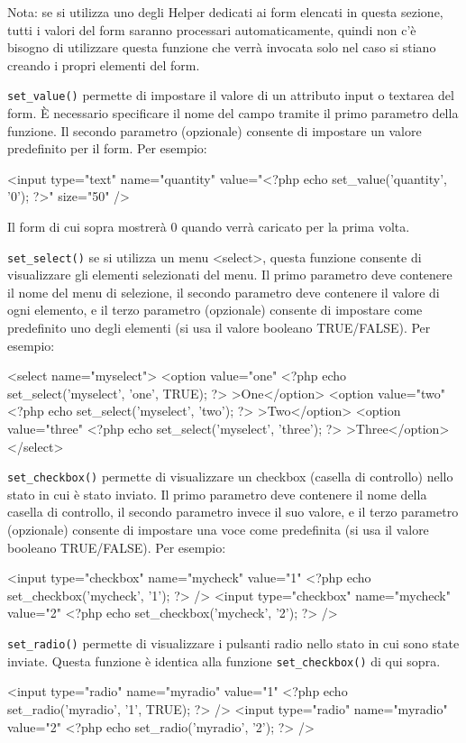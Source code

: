 Nota: se si utilizza uno degli Helper dedicati ai form elencati in questa sezione, tutti i valori del form saranno processari automaticamente, quindi non c'è bisogno di utilizzare questa funzione che verrà invocata solo nel caso si stiano creando i propri elementi del form.

\verb|set_value()| permette di impostare il valore di un attributo input o textarea del form. È necessario specificare il nome del campo tramite il primo parametro della funzione. Il secondo parametro (opzionale) consente di impostare un valore predefinito per il form. Per esempio:

\begin{code}
<input type="text" name="quantity" value="<?php echo set_value('quantity', '0'); ?>" size="50" />
\end{code}

Il form di cui sopra mostrerà 0 quando verrà caricato per la prima volta.

\verb|set_select()| se si utilizza un menu <select>, questa funzione consente di visualizzare gli elementi selezionati del menu. Il primo parametro deve contenere il nome del menu di selezione, il secondo parametro deve contenere il valore di ogni elemento, e il terzo parametro (opzionale) consente di impostare come predefinito uno degli elementi (si usa il valore booleano TRUE/FALSE). Per esempio:

\begin{code}
<select name="myselect">
<option value="one" <?php echo set_select('myselect', 'one', TRUE); ?> >One</option>
<option value="two" <?php echo set_select('myselect', 'two'); ?> >Two</option>
<option value="three" <?php echo set_select('myselect', 'three'); ?> >Three</option>
</select>
\end{code}

\verb|set_checkbox()| permette di visualizzare un checkbox (casella di controllo) nello stato in cui è stato inviato. Il primo parametro deve contenere il nome della casella di controllo, il secondo parametro invece il suo valore, e il terzo parametro (opzionale) consente di impostare una voce come predefinita (si usa il valore booleano TRUE/FALSE). Per esempio:

\begin{code}
<input type="checkbox" name="mycheck" value="1" <?php echo set_checkbox('mycheck', '1'); ?> />
<input type="checkbox" name="mycheck" value="2" <?php echo set_checkbox('mycheck', '2'); ?> />
\end{code}

\verb|set_radio()| permette di visualizzare i pulsanti radio nello stato in cui sono state inviate. Questa funzione è identica alla funzione \verb|set_checkbox()| di qui sopra.

\begin{code}
<input type="radio" name="myradio" value="1" <?php echo set_radio('myradio', '1', TRUE); ?> />
<input type="radio" name="myradio" value="2" <?php echo set_radio('myradio', '2'); ?> />
\end{code}